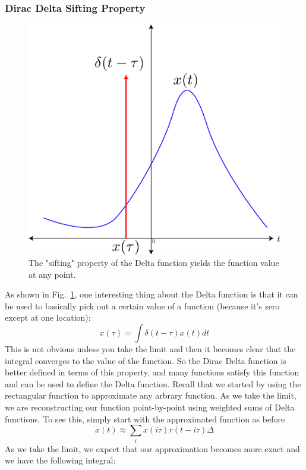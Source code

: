 \subsubsection{Dirac Delta Sifting Property}
\begin{figure}[tb]
\begin{center}
\includegraphics[width=.5\columnwidth]{delta_sift}
\end{center}
\caption{The "sifting" property of the Delta function yields the function value at any point. }
\label{fig:delta_sift}
\end{figure}
As shown in Fig.~\ref{fig:delta_sift}, one interesting thing about the Delta function is that it can be used to basically pick out a certain value of a function (because it's zero except at one location):
    \begin{equation}
        x\left(\tau\right)=\int\delta\left(t-\tau\right)x\left(t\right)dt
    \end{equation}
This is not obvious unless you take the limit and then it becomes clear that the integral converges to the value of the function.  So the Dirac Delta function is better defined in terms of this property, and many functions satisfy this function and can be used to define the Delta function.
Recall that we started by using the rectangular function to approximate any arbrary function.  As we take the limit, we are reconstructing our function point-by-point using weighted sums of Delta functions.  To see this, simply start with the approximated  function as before
    \begin{equation}
        x(t) \approx \sum_i x(i\tau) r(t - i\tau) \Delta
    \end{equation}
As we take the limit, we expect that our approximation becomes more exact and we have the following integral:
